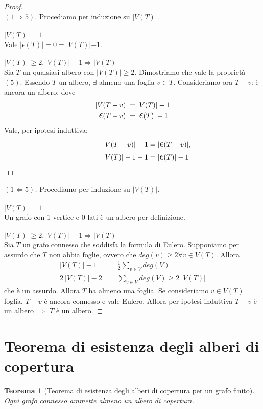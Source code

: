 \documentclass[12pt,twoside]{article}
\newcommand{\implica}{\Longrightarrow}
\renewcommand\qedsymbol{$\blacksquare$}
\newcommand{\Eps}{${\Large$\epsilon$}$}
\newcommand{\baseinduzalbero}[1]{\\\\{\boldmath$ |V(T)| = #1$}}
\newcommand{\induzalbero}[1]{\\\\{\boldmath$|V(T)| \ge #1, |V(T)| -1 \implica |V(T)|$}}
\newtheorem{theorem}{Teorema}
\begin{document}
\renewcommand\qedsymbol{$\square$}
\begin{proof}\ \\
$(1 \implica 5).$ Procediamo per induzione su $|V(T)|$.
\baseinduzalbero{1}
\\Vale $|\Eps(T)| = 0 = |V(T)| - 1$.
\induzalbero{2}\nopagebreak
\\Sia $T$ un qualsiasi albero con $|V(T)| \ge 2$. Dimostriamo che vale la proprietà $(5)$. Essendo $T$ un albero, $\exists$ almeno una foglia $v \in T$. Consideriamo ora $T - v$: è ancora un albero, dove
\begin{align*}
|V(T-v)| &= |V(T)| - 1 \\
| \mathlarger{\mathlarger{\epsilon}} (T-v) | &= |\mathlarger{\mathlarger{\epsilon}} (T) | -1 
\end{align*}
Vale, per ipotesi induttiva:
\begin{align*}
|V(T-v) | -1 &= |\mathlarger{\mathlarger{\epsilon}}(T-v)|,
\\ \qquad\qquad |V(T)| -1 -1 &= |\mathlarger{\mathlarger{\epsilon}}(T) | -1
\end{align*}
\end{proof}

\renewcommand\qedsymbol{$\blacksquare$}
\begin{proof}[$(1 \Longleftarrow 5)$]
Procediamo per induzione su $|V(T)|$.
\baseinduzalbero{1}
\\ Un grafo con 1 vertice e 0 lati è un albero per definizione.
\induzalbero{2}\nopagebreak
\\ Sia $T$ un grafo connesso che soddisfa la formula di Eulero. Supponiamo per assurdo che $T$ non abbia foglie, ovvero che $deg(v) \ge 2 \forall v \in V(T)$. Allora
\begin{align*}
|V(T)| - 1 &= \frac{1}{2} \sum_{v \in V} deg(V) \\ 
2\ |V(T) | -2 &= \sum_{v \in V} deg(V) \ge 2 \ |V(T)|
\end{align*}
che è un assurdo. Allora $T$ ha almeno una foglia. Se consideriamo $v \in V(T)$ foglia, $T-v$ è ancora connesso e vale Eulero. Allora per ipotesi induttiva $T - v$ è un albero $\implica$ $T$ è un albero.
\end{proof}

\section{Teorema di esistenza degli alberi di copertura}
\begin{theorem}[Teorema di esistenza degli alberi di copertura per un grafo finito]
Ogni grafo connesso ammette almeno un albero di copertura.
\end{theorem}
\end{document}
